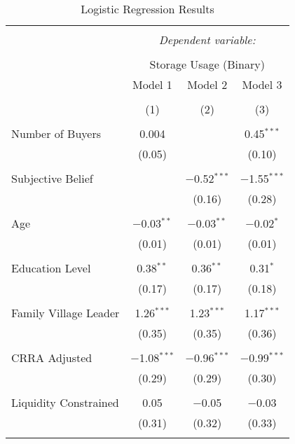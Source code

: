 
\begin{table}[!htbp] \centering 
  \caption{Logistic Regression Results} 
  \label{tab: binary storage ~ buyers' competition at harvest} 
\footnotesize 
\begin{tabular}{@{\extracolsep{5pt}}lccc} 
\\[-1.8ex]\hline 
\hline \\[-1.8ex] 
 & \multicolumn{3}{c}{\textit{Dependent variable:}} \\ 
\cline{2-4} 
\\[-1.8ex] & \multicolumn{3}{c}{Storage Usage (Binary)} \\ 
 & Model 1 & Model 2 & Model 3 \\ 
\\[-1.8ex] & (1) & (2) & (3)\\ 
\hline \\[-1.8ex] 
 Number of Buyers & 0.004 &  & 0.45$^{***}$ \\ 
  & (0.05) &  & (0.10) \\ 
  & & & \\ 
 Subjective Belief &  & $-$0.52$^{***}$ & $-$1.55$^{***}$ \\ 
  &  & (0.16) & (0.28) \\ 
  & & & \\ 
 Age & $-$0.03$^{**}$ & $-$0.03$^{**}$ & $-$0.02$^{*}$ \\ 
  & (0.01) & (0.01) & (0.01) \\ 
  & & & \\ 
 Education Level & 0.38$^{**}$ & 0.36$^{**}$ & 0.31$^{*}$ \\ 
  & (0.17) & (0.17) & (0.18) \\ 
  & & & \\ 
 Family Village Leader & 1.26$^{***}$ & 1.23$^{***}$ & 1.17$^{***}$ \\ 
  & (0.35) & (0.35) & (0.36) \\ 
  & & & \\ 
 CRRA Adjusted & $-$1.08$^{***}$ & $-$0.96$^{***}$ & $-$0.99$^{***}$ \\ 
  & (0.29) & (0.29) & (0.30) \\ 
  & & & \\ 
 Liquidity Constrained & 0.05 & $-$0.05 & $-$0.03 \\ 
  & (0.31) & (0.32) & (0.33) \\ 
  & & & \\ 

\end{tabular}
\end{table}
